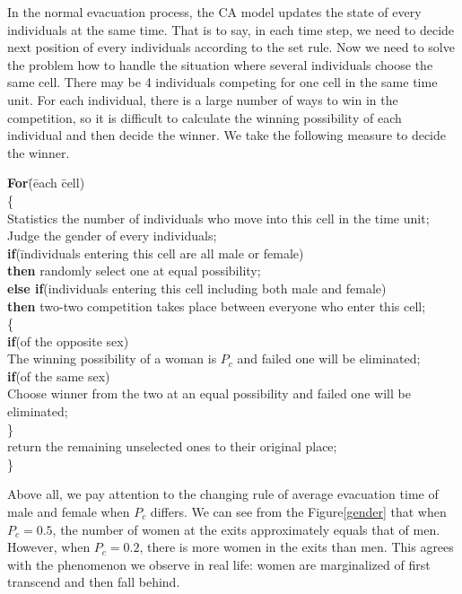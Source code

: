 \documentclass{mcmthesis}
\begin{document}
In the normal evacuation process, the CA model updates the state of every individuals at the same time. That is to say, in each time step, we need to decide next position of every individuals according to the set rule. Now we need to solve the problem how to handle the situation where several individuals choose the same cell. There may be 4 individuals competing for one cell in the same time unit. For each individual, there is a large number of ways to win in the competition, so it is difficult to calculate the winning possibility of each individual and then decide the winner. We take the following measure to decide the winner.
\begin{tabbing}
\textbf{For}\=(\=each \=cell)\\
\>\{\\
\>\> Statistics the number of individuals who move into this cell in the time unit;\\
\>\>Judge the gender of every individuals;\\
\>\>\textbf{if}(\= individuals entering this cell are all male or female)\\
\>\>\>\textbf{then} randomly select one at equal possibility;\\
\>\>\textbf{else if}(individuals entering this cell including both male and female)\\
\>\>\>\textbf{then} two-two competition takes place between everyone who enter this cell;\\
\>\>\{\\
\>\>\textbf{if}(of the opposite sex)\\
\>\>\>The winning possibility of a woman is $P_{c}$ and failed one will be eliminated;\\
\>\>\textbf{if}(of the same sex)\\
\>\>\>Choose winner from the two at an equal possibility and failed one will be eliminated;\\
\>\>\}\\
\>\>return the remaining unselected ones to their original place;\\
\>\}\\
\end{tabbing}
Above all, we pay attention to the changing rule of average evacuation time of male and female when $P_{c}$ differs. We can see from the Figure\ref{gender} that when $P_c=0.5$, the number of women at the exits approximately equals that of men. However, when $P_c=0.2$, there is more women in the exits than men. This agrees with the phenomenon we observe in real life: women are marginalized of first transcend and then fall behind.
\end{document}
